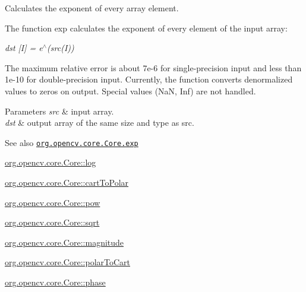 Calculates the exponent of every array element.

The function {\ttfamily exp} calculates the exponent of every element of the input array\+:

{\itshape dst \mbox{[}I\mbox{]} = e$^\wedge$(src(\+I))}

The maximum relative error is about {\ttfamily 7e-\/6} for single-\/precision input and less than {\ttfamily 1e-\/10} for double-\/precision input. Currently, the function converts denormalized values to zeros on output. Special values (NaN, Inf) are not handled.


\begin{DoxyParams}{Parameters}
{\em src} & input array. \\
\hline
{\em dst} & output array of the same size and type as {\ttfamily src}.\\
\hline
\end{DoxyParams}
\begin{DoxySeeAlso}{See also}
\href{http://docs.opencv.org/modules/core/doc/operations_on_arrays.html#exp}{\tt org.\+opencv.\+core.\+Core.\+exp} 

\mbox{\hyperlink{classorg_1_1opencv_1_1core_1_1_core_a34d89a9c8e2562fc85bfecca3dca7d76}{org.\+opencv.\+core.\+Core\+::log}} 

\mbox{\hyperlink{classorg_1_1opencv_1_1core_1_1_core_a395a53b9bd769978c12c2c19a02ffeae}{org.\+opencv.\+core.\+Core\+::cart\+To\+Polar}} 

\mbox{\hyperlink{classorg_1_1opencv_1_1core_1_1_core_a29c20af97ae09c75246777774bc6d41b}{org.\+opencv.\+core.\+Core\+::pow}} 

\mbox{\hyperlink{classorg_1_1opencv_1_1core_1_1_core_a5a2235761d8876294b3277876479107b}{org.\+opencv.\+core.\+Core\+::sqrt}} 

\mbox{\hyperlink{classorg_1_1opencv_1_1core_1_1_core_ac0195922fb03d6bad195054e615cb4e1}{org.\+opencv.\+core.\+Core\+::magnitude}} 

\mbox{\hyperlink{classorg_1_1opencv_1_1core_1_1_core_a90c17a6d7e194cd8baf45819267a4539}{org.\+opencv.\+core.\+Core\+::polar\+To\+Cart}} 

\mbox{\hyperlink{classorg_1_1opencv_1_1core_1_1_core_a09f94d89796effb89e2bff15c54b383a}{org.\+opencv.\+core.\+Core\+::phase}} 
\end{DoxySeeAlso}
\mbox{\label{classorg_1_1opencv_1_1core_1_1_core_aed121d8dfc230918f9086b7ba06c0b57}} 
